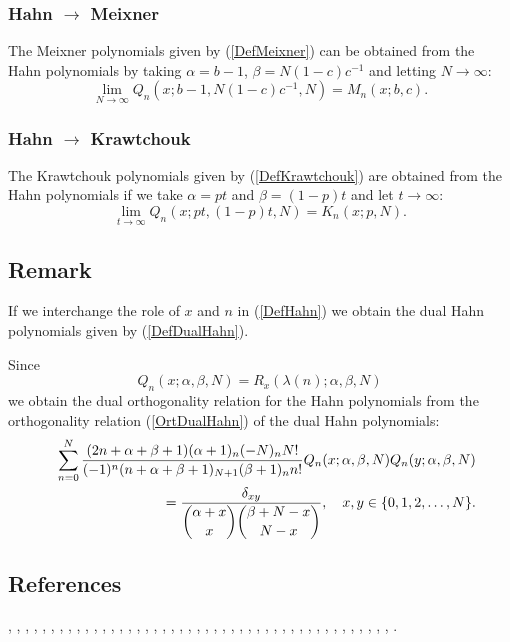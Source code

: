 \documentclass[envcountchap,graybox]{svmono}
\newcounter{rom}
\begin{document}
\subsubsection*{Hahn $\rightarrow$ Meixner}
The Meixner polynomials given by (\ref{DefMeixner}) can be obtained from the Hahn polynomials
by taking $\alpha=b-1$, $\beta=N(1-c)c^{-1}$ and letting $N\rightarrow\infty$:
\begin{equation}
\lim_{N\rightarrow\infty}
Q_n(x;b-1,N(1-c)c^{-1},N)=M_n(x;b,c).
\end{equation}

\subsubsection*{Hahn $\rightarrow$ Krawtchouk}
The Krawtchouk polynomials given by (\ref{DefKrawtchouk}) are obtained from the Hahn polynomials
if we take $\alpha=pt$ and $\beta=(1-p)t$ and let $t\rightarrow\infty$:
\begin{equation}
\lim_{t\rightarrow\infty}Q_n(x;pt,(1-p)t,N)=K_n(x;p,N).
\end{equation}

\subsection*{Remark}
If we interchange the role of $x$ and $n$ in (\ref{DefHahn}) we obtain the
dual Hahn polynomials given by (\ref{DefDualHahn}).

\noindent
Since
$$Q_n(x;\alpha,\beta,N)=R_x(\lambda(n);\alpha,\beta,N)$$
we obtain the dual orthogonality relation for the Hahn polynomials from the
orthogonality relation (\ref{OrtDualHahn}) of the dual Hahn polynomials:
\begin{eqnarray*}
& &\sum_{n=0}^N\frac{(2n+\alpha+\beta+1)(\alpha+1)_n(-N)_nN!}{(-1)^n(n+\alpha+\beta+1)_{N+1}(\beta+1)_nn!}
Q_n(x;\alpha,\beta,N)Q_n(y;\alpha,\beta,N)\\
& &{}=\frac{\delta_{xy}}{\dbinom{\alpha+x}{x}\dbinom{\beta+N-x}{N-x}},\quad x,y \in \{0,1,2,\ldots,N\}.
\end{eqnarray*}

\subsection*{References}
\cite{AlSalam90}, \cite{AndrewsAskey85}, \cite{Area+II}, \cite{Askey75},
\cite{Askey89I}, \cite{Askey2005}, \cite{AskeyGasper77}, \cite{AskeyWilson85},
\cite{AtakRahmanSuslov}, \cite{AtakSuslov88}, \cite{Chihara78},
\cite{Ciesielski}, \cite{Cooper+}, \cite{Dette95}, \cite{Dunkl76},
\cite{Dunkl78I}, \cite{Gasper73I}, \cite{Gasper74}, \cite{HoareRahman},
\cite{Ismail77}, \cite{Ismail2005II}, \cite{Karlin61}, \cite{Koorn81}, \cite{Koorn88},
\cite{LabelleYehI}, \cite{LabelleYehII}, \cite{Laine}, \cite{Lesky62},
\cite{Lesky88}, \cite{Lesky89}, \cite{Lesky94I}, \cite{Lesky95II},
\cite{LewanowiczII}, \cite{Neuman}, \cite{Nikiforov+}, \cite{NikiforovUvarov},
\cite{Rahman76III}, \cite{Rahman78I}, \cite{Rahman78II}, \cite{Rahman81III},
\cite{Sablonniere}, \cite{Stanton84}, \cite{Stanton90}, \cite{Wilson80}, \cite{Wilson70II},
\cite{Zarzo+}.
\end{document}
